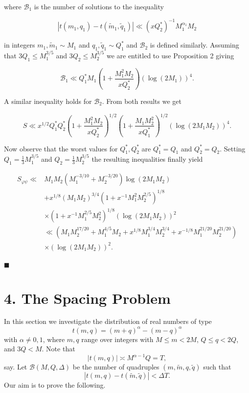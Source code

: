 \documentclass[10pt]{article}
\begin{document}
where $\mathscr{B}_{1}$ is the number of solutions to the inequality

$$
\left|t\left(m_{1}, q_{1}\right)-t\left(\tilde{m}_{1}, \tilde{q}_{1}\right)\right| \ll\left(x Q_{2}^{*}\right)^{-1} M_{1}^{\alpha_{1}} M_{2}
$$

in integers $m_{1}, \tilde{m}_{1} \sim M_{1}$ and $q_{1}, \tilde{q}_{1} \sim Q_{1}^{*}$ and $\mathscr{B}_{2}$ is defined similarly. Assuming that $3 Q_{1} \leqslant M_{1}^{3 / 5}$ and $3 Q_{2} \leqslant M_{2}^{3 / 5}$ we are entitled to use Proposition 2 giving

$$
\mathscr{B}_{1} \ll Q_{1}^{*} M_{1}\left(1+\frac{M_{1}^{2} M_{2}}{x Q_{2}^{*}}\right)\left(\log(2 M_{1})\right)^{4} .
$$

A similar inequality holds for $\mathscr{B}_{2}$. From both results we get

$$
S \ll x^{1 / 2} Q_{1}^{*} Q_{2}^{*}\left(1+\frac{M_{1}^{2} M_{2}}{x Q_{2}^{*}}\right)^{1 / 2}\left(1+\frac{M_{1} M_{2}^{2}}{x Q_{1}^{*}}\right)^{1 / 2}\left(\log\left(2 M_{1} M_{2}\right)\right)^{4} .
$$

Now observe that the worst values for $Q_{1}^{*}, Q_{2}^{*}$ are $Q_{1}^{*}=Q_{1}$ and $Q_{2}^{*}=Q_{2}$. Setting $Q_{1}=\frac{1}{3} M_{1}^{3 / 5}$ and $Q_{2}=\frac{1}{3} M_{2}^{3 / 5}$ the resulting inequalities finally yield

$$
\begin{aligned}
S_{\varphi \psi} \ll & M_{1} M_{2}\left(M_{1}^{-3 / 10}+M_{2}^{-3 / 20}\right) \log\left(2 M_{1} M_{2}\right) \\
& +x^{1 / 8}\left(M_{1} M_{2}\right)^{3 / 4}\left(1+x^{-1} M_{1}^{2} M_{2}^{2 / 5}\right)^{1 / 8} \\
& \times\left(1+x^{-1} M_{1}^{2 / 5} M_{2}^{2}\right)^{1 / 8}\left(\log\left(2 M_{1} M_{2}\right)\right)^{2} \\
& \ll\left(M_{1} M_{2}^{17 / 20}+M_{1}^{4 / 5} M_{2}+x^{1 / 8} M_{1}^{3 / 4} M_{2}^{3 / 4}+x^{-1 / 8} M_{1}^{21 / 20} M_{2}^{21 / 20}\right) \\
& \times\left(\log\left(2 M_{1} M_{2}\right)\right)^{2} .
\end{aligned}
$$

\(\blacksquare\)

\section*{4. The Spacing Problem}

In this section we investigate the distribution of real numbers of type
\[
  t(m,q)=(m+q)^\alpha-(m-q)^\alpha
\]
with $\alpha\ne0,1$, where $m,q$ range over integers with
$M\le m<2M$, $Q\le q<2Q$, and $3Q<M$. Note that
\[
  |t(m,q)|\asymp M^{\alpha-1}Q=T,
\]
say. Let $\mathscr B(M,Q,\Delta)$ be the number of quadruples
$(m,\widetilde m,q,\widetilde q)$ such that
\begin{equation*}
  |t(m,q)-t(\widetilde m,\widetilde q)|<\Delta T.
  \tag{4.1}
\end{equation*}
Our aim is to prove the following.
\end{document}
